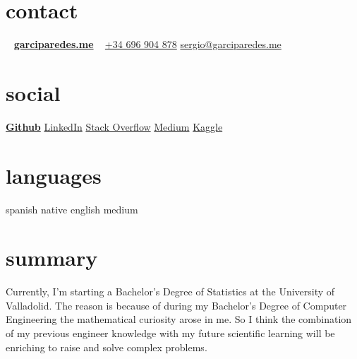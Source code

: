 \documentclass{friggeri-cv}
\begin{document}


  \begin{aside}
    \section{contact}
      ~
      \href{http://garciparedes.me}{\textbf{garciparedes.me}}
      ~
      \href{tel:+34 696 904 878}{+34 696 904 878}
      \href{mailto:sergio@garciparedes.me}{sergio@garciparedes.me}
    \section{social}
      \href{https://github.com/garciparedes}{\quad{\color{red} $\varheartsuit$}\quad\textbf{Github}\quad\faGithub }
      \href{https://es.linkedin.com/in/garciparedes/en}{LinkedIn\quad\faLinkedin }
      \href{http://stackoverflow.com/users/3921457/garciparedes}{Stack Overflow\quad\faStackOverflow }
      \href{https://medium.com/@garciparedes}{Medium\quad\faMedium }
      \href{https://www.kaggle.com/garciparedes}{Kaggle\quad\faTrophy }
    \section{languages}
      spanish native
      english medium
  \end{aside}




  \section{summary}

    Currently, I'm starting a Bachelor's Degree of Statistics at the University of Valladolid. The reason is because of during my Bachelor's Degree of Computer Engineering the mathematical curiosity arose in me. So I think the combination of my previous engineer knowledge with my future scientific learning will be enriching to raise and solve complex problems.
\end{document}
